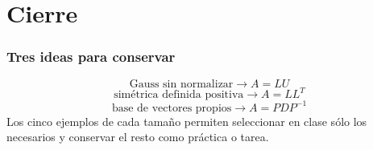 \section{Cierre}

\subsubsection*{Tres ideas para conservar}

\[
\boxed{\text{Gauss sin normalizar}\longrightarrow A=LU}
\]
\[
\boxed{\text{simétrica definida positiva}\longrightarrow A=LL^T}
\]
\[
\boxed{\text{base de vectores propios}\longrightarrow A=PDP^{-1}}
\]
\medskip
Los cinco ejemplos de cada tamaño permiten seleccionar en clase sólo los necesarios y conservar el resto como práctica o tarea.

